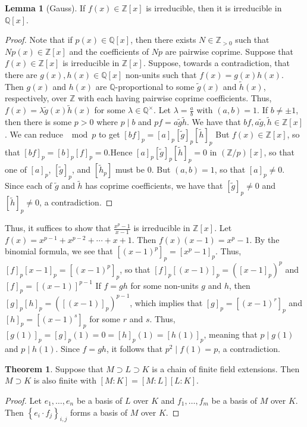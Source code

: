\documentclass[10pt,letterpaper,cm]{nupset}
\theoremstyle{definition}
\theoremstyle{theorem}
\newtheorem{theorem}[definition]{Theorem}
\newtheorem{lemma}[definition]{Lemma}
\theoremstyle{remark}
\newcommand{\Q}{\mathbb Q}
\newcommand{\Z}{\mathbb Z}
\newcommand{\1}{\mathbf{1}}
\newcommand{\0}{\vec 0}
\begin{document}
\begin{lemma}[Gauss]
If $f(x) \in \Z[x]$ is irreducible, then it is irreducible in $\Q[x]$.
\end{lemma}
\begin{proof}
Note that if $p(x) \in \Q[x]$, then there exists $N \in \Z_{>0}$ such that $N p(x) \in \Z[x]$ and the coefficients  of $Np$ are pairwise coprime. Suppose that $f(x) \in \Z[x]$ is irreducible in $\Z[x]$. Suppose, towards a contradiction, that  there are $g(x), h(x)\in \Q[x]$ non-units such that $f(x) = g(x)h(x)$. Then $g(x)$ and $h(x)$ are $\Q$-proportional to some $\tilde{g}(x)$ and $\tilde{h}(x)$, respectively, over $\Z$ with each having pairwise coprime coefficients. Thus, $f(x) = \lambda \tilde{g}(x)\tilde{h}(x)$ for some $\lambda \in \Q^{\times}$. Let $\lambda = \frac{a}{b}$ with $\left(a,b\right)=1$. If $b \ne \pm 1$, then there is some $p>0$ where $p \mid b$ and $pf = a \tilde{g}\tilde{h}$. We have that $bf, a \tilde{g}, \tilde{h} \in \Z[x]$. We can reduce $\mod p$ to get $[bf]_p = [a]_p[\tilde{g}]_p[\tilde{h}]_p$ But $f(x) \in \Z[x]$, so that $[bf]_p  = [b]_p[f]_p =0$.Hence $[a]_p[\tilde{g}]_p[\tilde{h}]_p =0$ in $\left(\Z/p\right)[x]$, so that one of $[a]_p$, $\left[\tilde{g}\right]_p$, and $\left[\tilde{h}_p\right]$ must be $0$. But $\left(a,b\right) =1$, so that $[a]_p \ne 0$. Since each of $\tilde{g}$ and $\tilde{h}$ has coprime coefficients, we have that $\left[\tilde{g}\right]_p \ne 0$ and $\left[\tilde{h}\right]_p \ne 0$, a contradiction. 
\end{proof}

Thus, it suffices to show that $\frac{x^p-1}{x-1}$  is irreducible in $\Z[x]$. Let $f(x) = x^{p-1} + x^{p-2} + \cdots + x + 1$. Then $f(x)\left(x-1\right) = x^p-1$. By the binomial formula, we see that $[(x-1)^p]_p = [x^p-1]_p$. Thus, $[f]_p[x-1]_p = \left[\left(x-1\right)^p\right]_p$, so that $[f]_p[(x-1)]_p = \left(\left[x-1\right]_p\right)^p$ and $[f]_p = \left[\left(x-1\right)\right]^{p-1}$ If $f=gh$ for some non-units $g$ and $h$, then $[g]_p[h]_p = \left([(x-1)]_p\right)^{p-1}$, which implies that $[g]_p = [(x-1)^r]_p$ and $[h]_p = [(x-1)^s]_p$ for some $r$ and $s$. Thus, $[g(1)]_p = [g]_p(1) = 0 = [h]_p(1)= [h(1)]_p$, meaning that $p\mid g(1)$ and $p\mid h(1)$. Since $f=gh$, it follows that $p^2 \mid f(1) =p$, a contradiction.

\smallskip

\begin{theorem}\label{lt}
Suppose that $M \supset L \supset K$ is a chain of finite field extensions. Then $M \supset K$ is also finite with $[M:K] = [M:L][L:K]$.
\end{theorem}
\begin{proof}
Let $e_1, \ldots, e_n$ be a basis of $L$ over $K$ and $f_1, \ldots, f_m$ be a basis of $M$ over $K$. Then $\left\{e_i\cdot f_j\right\}_{i,j}$ forms a basis of $M$ over $K$.
\end{proof}
\end{document}
